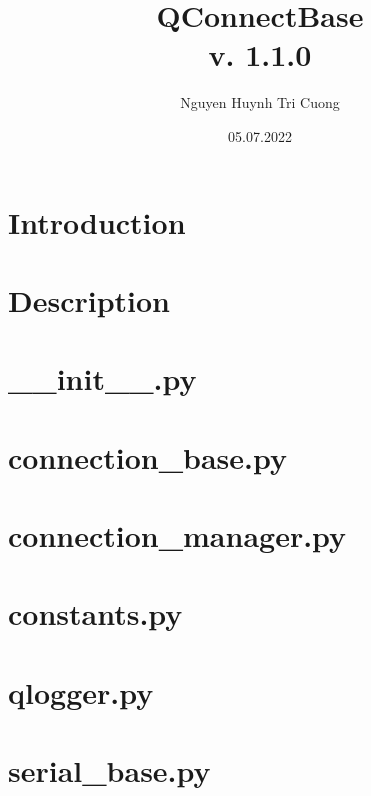 \documentclass[a4paper,10pt]{report}
\title{\textbf{QConnectBase}\\
\vspace{2ex}
\textbf{v. 1.1.0}}
\author{Nguyen Huynh Tri Cuong}
\date{05.07.2022}
\begin{document}
\hypersetup{pageanchor=false}

\maketitle

\clearpage
{}
\tableofcontents

\clearpage
{}

\hypersetup{pageanchor=true}

      

\chapter{Introduction}

      

\chapter{Description}

      

\chapter{\_\_init\_\_.py}

      

\chapter{connection\_base.py}

      

\chapter{connection\_manager.py}

      

\chapter{constants.py}

      

\chapter{qlogger.py}

      

\chapter{serial\_base.py}

      
\end{document}
